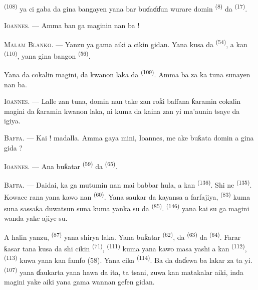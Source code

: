  \textsuperscript{(108)} ya ci gaba da gina bangayen
yana bar buɗaɗɗun wurare domin  \textsuperscript{(8)} da
 \textsuperscript{(17)}.

\textsc{Ioannes}. --- Amma ban ga maginin nan ba !

\textsc{Malam Blanko}. --- Yanzu ya gama aiki a cikin gidan. Yana kusa
da  \textsuperscript{(54)}, a kan  \textsuperscript{(110)}, yana gina bangon 
\textsuperscript{(56)}.

Yana da cokalin magini, da kwanon laka da 
\textsuperscript{(109)}. Amma ba za ka tuna sunayen nan ba.

\textsc{Ioannes}. --- Lalle zan tuna, domin nan take zan roƙi baffana
ƙaramin cokalin magini da ƙaramin kwanon laka, ni kuma da kaina zan yi
ma’aunin tsaye da igiya.

\VUsaut{3.0mm}
\VUsaut{3.0mm}

\textsc{Baffa}. --- Kai ! madalla. Amma gaya mini, Ioannes, me ake
buƙata domin a gina gida ?

\textsc{Ioannes}. --- Ana buƙatar 
\textsuperscript{(59)} da  \textsuperscript{(65)}.

\textsc{Baffa}. --- Daidai, ka ga mutumin nan mai babbar hula, a kan
 \textsuperscript{(136)}. Shi ne  \textsuperscript{(135)}. Kowace rana yana kawo nan  \textsuperscript{(60)}. Yana saukar da kayansa a farfajiya,
 \textsuperscript{(83)} kuma suna sassaƙa
duwatsun suna kuma yanka su da 
\textsuperscript{(85)}.  \textsuperscript{(146)}
yana kai su ga magini wanda yake ajiye su.

A halin yanzu,  \textsuperscript{(87)} yana shirya
laka. Yana buƙatar  \textsuperscript{(62)}, da  \textsuperscript{(63)} da  \textsuperscript{(64)}.
Farar ƙasar tana kusa da shi cikin  \textsuperscript{(71)},
 \textsuperscript{(111)} kuma yana kawo masa
yashi a kan  \textsuperscript{(112)}, 
\textsuperscript{(113)} kuwa yana kan famfo (58). Yana cika
 \textsuperscript{(114)}. Ba da daɗewa ba lakar za ta yi.
 \textsuperscript{(107)} yana ɗaukarta yana hawa
da ita, ta tsani, zuwa kan matakalar aiki, inda magini yake aiki yana
gama wannan gefen gidan.


